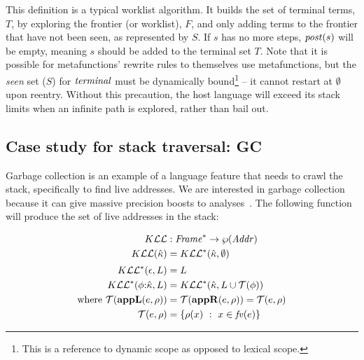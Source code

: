 This definition is a typical worklist algorithm.
%
It builds the set of terminal terms, $T$, by exploring the frontier (or worklist), $F$, and only adding terms to the frontier that have not been seen, as represented by $S$.
%
If $s$ has no more steps, $\mathit{post}(s)$ will be empty, meaning $s$ should be added to the terminal set $T$.%
%
Note that it is possible for metafunctions' rewrite rules to themselves use metafunctions, but the \emph{seen} set ($S$) for $\mathit{terminal}$ must be dynamically bound\footnote{This is a reference to dynamic scope as opposed to lexical scope.} -- it cannot restart at $\emptyset$ upon reentry.
%
Without this precaution, the host language will exceed its stack limits when an infinite path is explored, rather than bail out.

\subsection{Case study for stack traversal: GC}\label{sec:gc}
Garbage collection is an example of a language feature that needs to crawl the stack, specifically to find live addresses.
%
We are interested in garbage collection because it can give massive precision boosts to analyses~\citep{dvanhorn:Might:2006:GammaCFA,dvanhorn:Earl2012Introspective}.
%
The following function will produce the set of live addresses in the stack:

\begin{align*}
  K{\mathcal L}{\mathcal L} &: \mathit{Frame}^* \to \wp(\mathit{Addr}) \\
  K{\mathcal L}{\mathcal L}({\hat{\kappa}}) &= K{\mathcal L}{\mathcal L}^*({\hat{\kappa}},\emptyset) \\[2pt]
  K{\mathcal L}{\mathcal L}^*(\epsilon,L) &= L \\
  K{\mathcal L}{\mathcal L}^*(\phi{\tt :} {\hat{\kappa}}, L) &= K{\mathcal L}{\mathcal L}^*({\hat{\kappa}}, L\cup{\mathcal T}(\phi)) \\
  \text{where } {\mathcal T}(\mathbf{appL}(e,\rho)) &= {\mathcal T}(\mathbf{appR}(e,\rho)) = {\mathcal T}(e,\rho) \\
                {\mathcal T}(e,\rho) &= \{ \rho(x)\ :\ x \in \mathit{fv}(e)\}
\end{align*}

